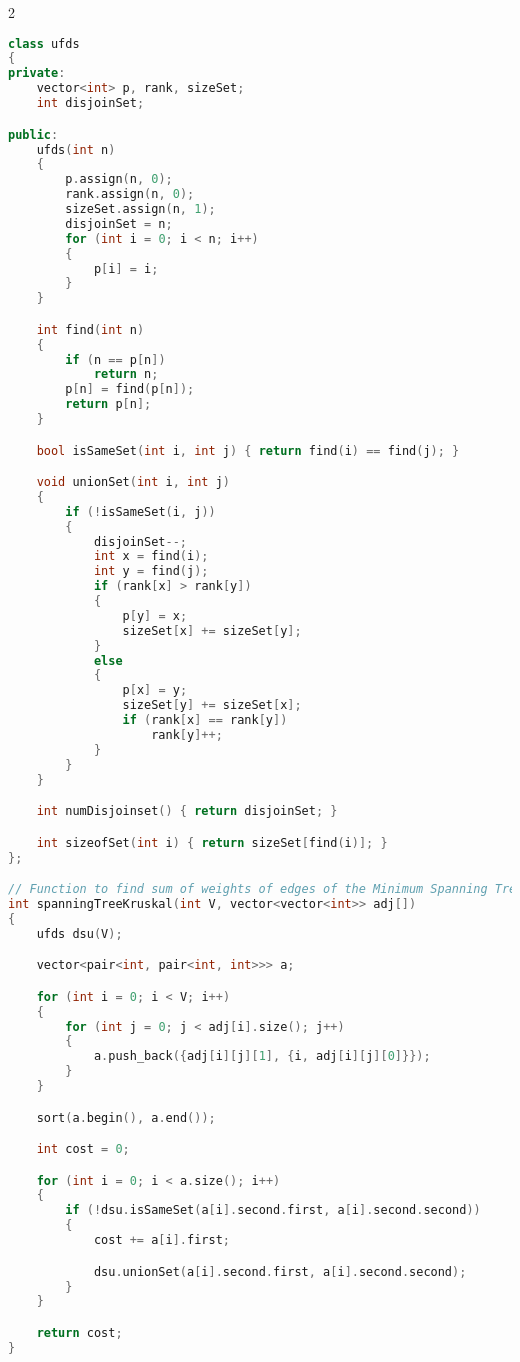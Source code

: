 \documentclass[leter]{amsart}
\begin{document}
\begin{multicols}{2}
\begin{lstlisting}[language=C++]
class ufds
{
private:
    vector<int> p, rank, sizeSet;
    int disjoinSet;

public:
    ufds(int n)
    {
        p.assign(n, 0);
        rank.assign(n, 0);
        sizeSet.assign(n, 1);
        disjoinSet = n;
        for (int i = 0; i < n; i++)
        {
            p[i] = i;
        }
    }

    int find(int n)
    {
        if (n == p[n])
            return n;
        p[n] = find(p[n]);
        return p[n];
    }

    bool isSameSet(int i, int j) { return find(i) == find(j); }

    void unionSet(int i, int j)
    {
        if (!isSameSet(i, j))
        {
            disjoinSet--;
            int x = find(i);
            int y = find(j);
            if (rank[x] > rank[y])
            {
                p[y] = x;
                sizeSet[x] += sizeSet[y];
            }
            else
            {
                p[x] = y;
                sizeSet[y] += sizeSet[x];
                if (rank[x] == rank[y])
                    rank[y]++;
            }
        }
    }

    int numDisjoinset() { return disjoinSet; }

    int sizeofSet(int i) { return sizeSet[find(i)]; }
};

// Function to find sum of weights of edges of the Minimum Spanning Tree.
int spanningTreeKruskal(int V, vector<vector<int>> adj[])
{
    ufds dsu(V);

    vector<pair<int, pair<int, int>>> a;

    for (int i = 0; i < V; i++)
    {
        for (int j = 0; j < adj[i].size(); j++)
        {
            a.push_back({adj[i][j][1], {i, adj[i][j][0]}});
        }
    }

    sort(a.begin(), a.end());

    int cost = 0;

    for (int i = 0; i < a.size(); i++)
    {
        if (!dsu.isSameSet(a[i].second.first, a[i].second.second))
        {
            cost += a[i].first;

            dsu.unionSet(a[i].second.first, a[i].second.second);
        }
    }

    return cost;
}

\end{lstlisting}
\end{multicols}
\end{document}
